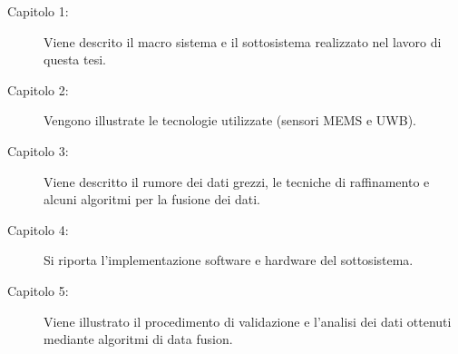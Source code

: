 \begin{description}
\item [Capitolo 1:] Viene descrito il macro sistema e il sottosistema realizzato nel lavoro di questa tesi.
\item [Capitolo 2:] Vengono illustrate le tecnologie utilizzate (sensori MEMS e UWB).
\item [Capitolo 3:] Viene descritto il rumore dei dati grezzi, le tecniche di raffinamento e alcuni algoritmi per la fusione dei dati.
\item [Capitolo 4:] Si riporta l'implementazione software e hardware del sottosistema.
\item [Capitolo 5:] Viene illustrato il procedimento di validazione e l'analisi dei dati ottenuti mediante algoritmi di data fusion.
\end{description}